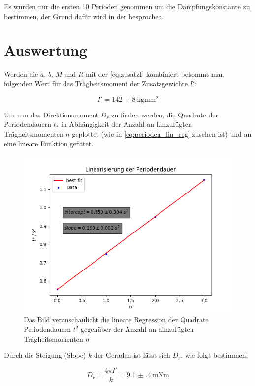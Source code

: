\documentclass[11pt,ngerman]{scrartcl}
\begin{document}
Es wurden nur die ersten 10 Perioden genommen um die Dämpfungskonstante 
zu bestimmen, der Grund dafür wird in der  besprochen.

\section{Auswertung}
\label{sec:auswertung}

Werden die $a$, $b$, $M$ und $R$ mit der \autoref{eq:zusatzI} kombiniert
bekommt man folgenden Wert für das Trägheitsmoment der Zusatzgewichte $I'$:

\begin{equation}
    I' = \SI{142(8)}{\kg\mm\squared}
\end{equation}

Um nun das Direktionsmoment $D_r$ zu finden werden, die Quadrate der Periodendauern $t_{*}$
in Abhängigkeit der Anzahl an hinzufügten Trägheitsmomenten $n$
geplottet (wie in \autoref{eq:perioden_lin_reg} zusehen ist) und an eine lineare Funktion gefittet.

\begin{figure}[H]
    \centering
    \includegraphics[width=0.8\linewidth]{pics/lin_reg_n_t.png}
    \caption{Das Bild veranschaulicht die lineare Regression der Quadrate Periodendauern $t^2$
    gegenüber der Anzahl an hinzufügten Trägheitsmomenten $n$}%
    \label{fig:lin_reg}
\end{figure}

Durch die Steigung (Slope) $k$ der Geraden ist lässt sich $D_r$, wie folgt
bestimmen:

\begin{equation}
    D_r = \frac{4\pi I'}{k} = \SI{9.1(4)}{\mN\meter}
\end{equation}
\end{document}
